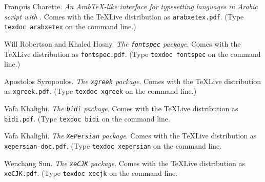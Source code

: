 \begin{thebibliography}{99}
 Fran\c{c}ois Charette.                    
    \newblock \emph{An Arab\TeX-like interface for typesetting languages
     in Arabic script with }.                                        
    \newblock Comes with the \TeX Live distribution as                                            
  \texttt{arabxetex.pdf}. (Type \texttt{texdoc arabxetex} on the command line.)

 Will Robertson and Khaled Hosny.                    
    \newblock \emph{The \texttt{fontspec} package}.                                        
    \newblock Comes with the \TeX Live distribution as                                            
  \texttt{fontspec.pdf}. (Type \texttt{texdoc fontspec} on the command line.)
    
 Apostolos Syropoulos.                    
    \newblock \emph{The \texttt{xgreek} package}.                                        
    \newblock Comes with the \TeX Live distribution as                                            
  \texttt{xgreek.pdf}. (Type \texttt{texdoc xgreek} on the command line.)

 Vafa Khalighi.                    
    \newblock \emph{The \texttt{bidi} package}.                                        
    \newblock Comes with the \TeX Live distribution as                                            
  \texttt{bidi.pdf}. (Type \texttt{texdoc bidi} on the command line.

 Vafa Khalighi.                    
    \newblock \emph{The \texttt{XePersian} package}.                                        
    \newblock Comes with the \TeX Live distribution as                                            
  \texttt{xepersian-doc.pdf}. (Type \texttt{texdoc xepersian} on the command line.

 Wenchang Sun.                    
    \newblock \emph{The \texttt{xeCJK} package}.                                        
    \newblock Comes with the \TeX Live distribution as                                            
  \texttt{xeCJK.pdf}. (Type \texttt{texdoc xecjk} on the command line.

\end{thebibliography}


%

